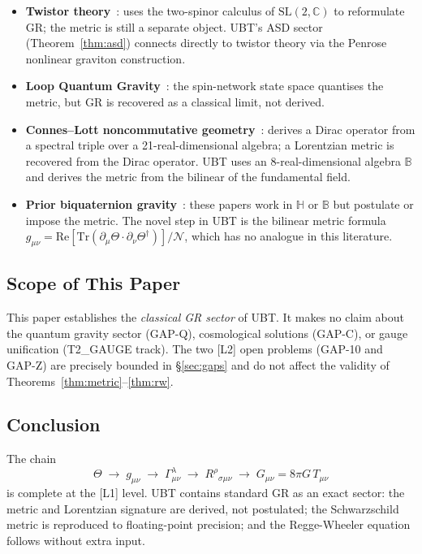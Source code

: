 \documentclass[12pt,a4paper]{article}
\theoremstyle{definition}
\theoremstyle{remark}
\newcommand{\BB}{\mathbb{B}}
\newcommand{\CC}{\mathbb{C}}
\newcommand{\HH}{\mathbb{H}}
\newcommand{\Tr}{\mathrm{Tr}}
\newcommand{\re}{\mathrm{Re}}
\newcommand{\calN}{\mathcal{N}}
\begin{document}
\begin{itemize}
  \item \textbf{Twistor theory}~\cite{penrose1976,penrose_rindler1984}:
        uses the two-spinor calculus of $\mathrm{SL}(2,\CC)$ to reformulate
        GR; the metric is still a separate object.
        UBT's ASD sector (Theorem~\ref{thm:asd}) connects directly to twistor
        theory via the Penrose nonlinear graviton construction.

  \item \textbf{Loop Quantum Gravity}~\cite{thiemann2007}:
        the spin-network state space quantises the metric, but GR is
        recovered as a classical limit, not derived.

  \item \textbf{Connes--Lott noncommutative geometry}~\cite{connes1991}:
        derives a Dirac operator from a spectral triple over a
        21-real-dimensional algebra; a Lorentzian metric is recovered
        from the Dirac operator.
        UBT uses an 8-real-dimensional algebra $\BB$ and derives the
        metric from the bilinear of the fundamental field.

  \item \textbf{Prior biquaternion gravity}~\cite{adler1995,finkelstein1962,deleo1996}:
        these papers work in $\HH$ or $\BB$ but postulate or impose the
        metric.
        The novel step in UBT is the bilinear metric formula
        $g_{\mu\nu} = \re[\Tr(\partial_\mu\Theta \cdot \partial_\nu\Theta^\dagger)]/\calN$,
        which has no analogue in this literature.
\end{itemize}

\subsection{Scope of This Paper}

This paper establishes the \emph{classical GR sector} of UBT.
It makes no claim about the quantum gravity sector (GAP-Q),
cosmological solutions (GAP-C), or gauge unification (T2\_GAUGE track).
The two [L2] open problems (GAP-10 and GAP-Z) are precisely bounded in
\S\ref{sec:gaps} and do not affect the validity of Theorems~\ref{thm:metric}--\ref{thm:rw}.

\subsection{Conclusion}

The chain
\[
  \Theta \;\longrightarrow\;
  g_{\mu\nu} \;\longrightarrow\;
  \Gamma^\lambda_{\mu\nu} \;\longrightarrow\;
  R^\rho{}_{\sigma\mu\nu} \;\longrightarrow\;
  G_{\mu\nu} = 8\pi G\,T_{\mu\nu}
\]
is complete at the [L1] level.
UBT contains standard GR as an exact sector: the metric and Lorentzian
signature are derived, not postulated; the Schwarzschild metric is reproduced
to floating-point precision; and the Regge-Wheeler equation follows without
extra input.
\end{document}
